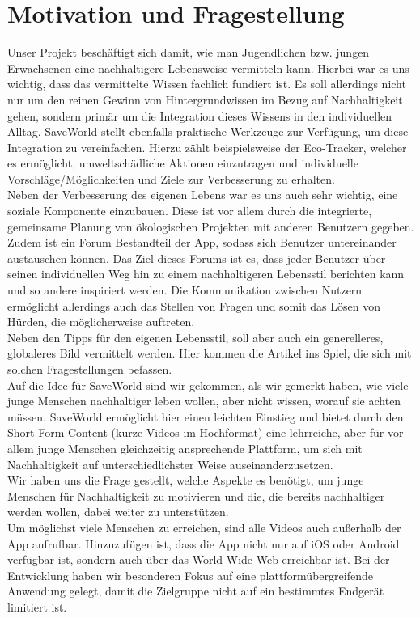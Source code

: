 \documentclass[../main.tex]{subfiles}
\begin{document}
	\chapter{Motivation und Fragestellung}

	Unser Projekt beschäftigt sich damit, wie man Jugendlichen bzw. jungen Erwachsenen eine nachhaltigere Lebensweise vermitteln kann.
	Hierbei war es uns wichtig, dass das vermittelte Wissen fachlich fundiert ist.
	Es soll allerdings nicht nur um den reinen Gewinn von Hintergrundwissen im Bezug auf Nachhaltigkeit gehen, sondern primär um die Integration dieses Wissens in den individuellen Alltag.
	SaveWorld stellt ebenfalls praktische Werkzeuge zur Verfügung, um diese Integration zu vereinfachen.
	Hierzu zählt beispielsweise der Eco-Tracker, welcher es ermöglicht, umweltschädliche Aktionen einzutragen und individuelle Vorschläge/Möglichkeiten und Ziele zur Verbesserung zu erhalten.
	\\
	Neben der Verbesserung des eigenen Lebens war es uns auch sehr wichtig, eine soziale Komponente einzubauen.
	Diese ist vor allem durch die integrierte, gemeinsame Planung von ökologischen Projekten mit anderen Benutzern gegeben.
	Zudem ist ein Forum Bestandteil der App, sodass sich Benutzer untereinander austauschen können.
	Das Ziel dieses Forums ist es, dass jeder Benutzer über seinen individuellen Weg hin zu einem nachhaltigeren Lebensstil berichten kann und so andere inspiriert werden.
	Die Kommunikation zwischen Nutzern ermöglicht allerdings auch das Stellen von Fragen und somit das Lösen von Hürden, die möglicherweise auftreten.
	\\
	Neben den Tipps für den eigenen Lebensstil, soll aber auch ein generelleres, globaleres Bild vermittelt werden.
	Hier kommen die Artikel ins Spiel, die sich mit solchen Fragestellungen befassen.
	\\
	Auf die Idee für SaveWorld sind wir gekommen, als wir gemerkt haben, wie viele junge Menschen nachhaltiger leben wollen, aber nicht wissen, worauf sie achten müssen.
	SaveWorld ermöglicht hier einen leichten Einstieg und bietet durch den Short-Form-Content (kurze Videos im Hochformat) eine lehrreiche, aber für vor allem junge Menschen gleichzeitig ansprechende Plattform, um sich mit Nachhaltigkeit auf unterschiedlichster Weise auseinanderzusetzen.
	\\
	Wir haben uns die Frage gestellt, welche Aspekte es benötigt, um junge Menschen für Nachhaltigkeit zu motivieren und die, die bereits nachhaltiger werden wollen, dabei weiter zu unterstützen.
	\\
	Um möglichst viele Menschen zu erreichen, sind alle Videos auch außerhalb der App aufrufbar.
	Hinzuzufügen ist, dass die App nicht nur auf iOS oder Android verfügbar ist, sondern auch über das World Wide Web erreichbar ist.
	Bei der Entwicklung haben wir besonderen Fokus auf eine plattformübergreifende Anwendung gelegt, damit die Zielgruppe nicht auf ein bestimmtes Endgerät limitiert ist.
\end{document}
